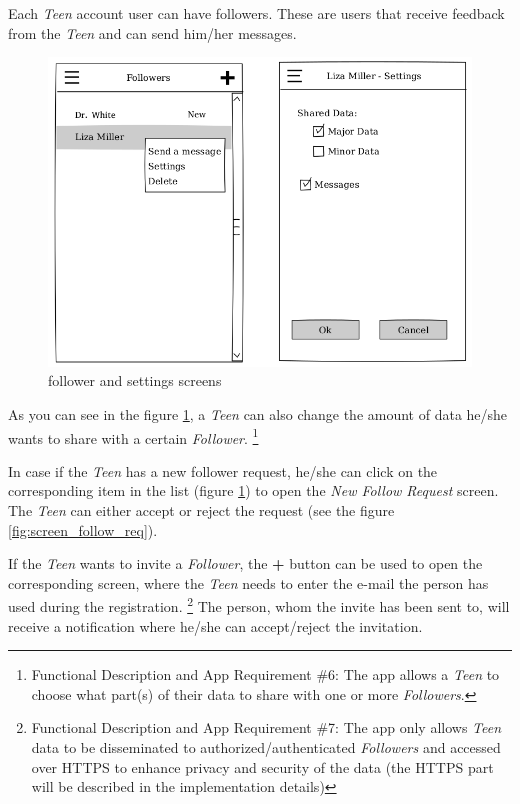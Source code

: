 \documentclass{article}
\begin{document}
    Each \emph{Teen} account user can have followers. These are users that receive feedback from the \emph{Teen} and can send him/her messages.

    \begin{figure}[h]
        \centering
        \includegraphics[width=\textwidth,height=\textheight,keepaspectratio]{followers.png}
        \caption{follower and settings screens}
        \label{fig:screen_followers}
    \end{figure}

    As you can see in the figure \ref{fig:screen_followers}, a \emph{Teen} can also change the amount of data he/she wants to share with a certain \emph{Follower}.
    \footnote{Functional Description and App Requirement \#6: The app allows a \emph{Teen} to choose what part(s) of their data to share with one or more \emph{Followers}.}

\newpage

In case if the \emph{Teen} has a new follower request, he/she can click on the corresponding item in the list (figure \ref{fig:screen_followers}) to open the \emph{New Follow Request} screen. The \emph{Teen} can  either accept or reject the request (see the figure \ref{fig:screen_follow_req}).
    
    If the \emph{Teen} wants to invite a \emph{Follower}, the \textbf{+} button can be used to open the corresponding screen, where the \emph{Teen} needs to enter the e-mail the person has used during the registration.
    \footnote{Functional Description and App Requirement \#7: The app only allows \emph{Teen} data to be disseminated to authorized/authenticated \emph{Followers} and accessed over HTTPS to enhance privacy and security of the data (the HTTPS part will be described in the implementation details)}
    The person, whom the invite has been sent to, will receive a notification where he/she can accept/reject the invitation.
\end{document}
